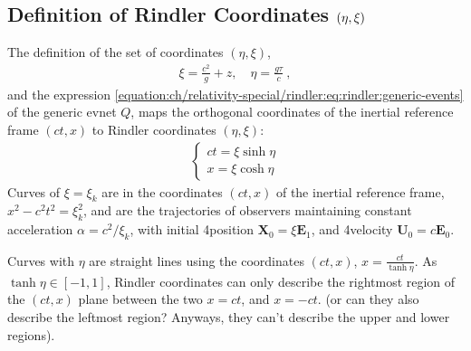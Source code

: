 \documentclass[letterpaper,10pt,english]{jupyterBook}
\begin{document}
\subsection{Definition of Rindler Coordinates \protect\((\eta, \xi)\protect\)}
\label{\detokenize{ch/relativity-special/rindler:definition-of-rindler-coordinates-eta-xi}}\label{\detokenize{ch/relativity-special/rindler:relativity-special-rindler-construction-rindler-coords-def}}
\sphinxAtStartPar
The definition of the set of coordinates \(( \eta, \xi )\),
\begin{equation}\label{equation:ch/relativity-special/rindler:eq:rindler:def}
\begin{split}\xi = \frac{c^2}{g} + z, \quad \eta = \frac{g \tau}{c} \ ,\end{split}
\end{equation}
\sphinxAtStartPar
and the expression \eqref{equation:ch/relativity-special/rindler:eq:rindler:generic-events} of the generic evnet \(Q\), maps the orthogonal coordinates of the inertial reference frame \((ct, x)\) to Rindler coordinates \((\eta, \xi)\):
\begin{equation*}
\begin{split}\begin{cases} c t = \xi \sinh \eta \\ x = \xi \cosh \eta \end{cases}\end{split}
\end{equation*}
\sphinxAtStartPar
Curves of  \(\xi = \xi_k\) are  in the coordinates \((ct, x)\) of the inertial reference frame, \(x^2 - c^2 t^2 = \xi_k^2\), and are the trajectories of observers maintaining constant acceleration \(\alpha = c^2 / \xi_k\), with initial 4\sphinxhyphen{}position \(\mathbf{X}_0 = \xi \mathbf{E}_1\), and 4\sphinxhyphen{}velocity \(\mathbf{U}_0 = c \mathbf{E}_0\).

\sphinxAtStartPar
Curves with  \(\eta\) are straight lines using the coordinates \((ct, x)\), \(x = \frac{c t}{\tanh \eta}\). As \(\tanh\eta \in [-1, 1]\), Rindler coordinates can only describe the right\sphinxhyphen{}most region of the \((ct,x)\) plane between the two  \(x = ct\), and \(x  = -ct\). (or can they also describe the left\sphinxhyphen{}most region? Anyways, they can’t describe the upper and lower regions).
\end{document}
